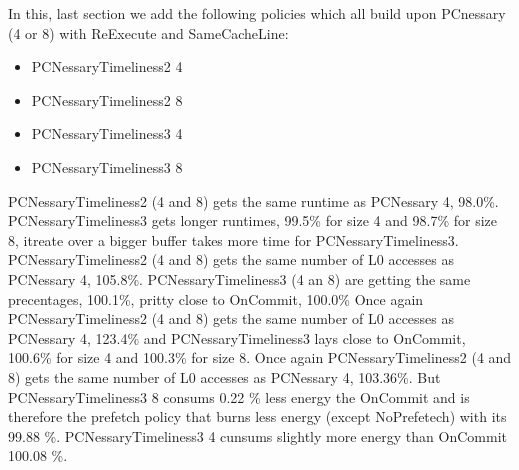 In this, last section we add the following policies which all build upon PCnessary (4 or 8) with ReExecute and SameCacheLine:
\begin{itemize}
	\item PCNessaryTimeliness2 4
	\item PCNessaryTimeliness2 8
	\item PCNessaryTimeliness3 4
	\item PCNessaryTimeliness3 8
\end{itemize}
\resExtime
{}
PCNessaryTimeliness2 (4 and 8) gets the same runtime as PCNessary 4, 98.0\%. PCNessaryTimeliness3 gets longer runtimes, 99.5\% for size 4 and 98.7\% for size 8, itreate over a bigger buffer takes more time for PCNessaryTimeliness3.
\resAcc
{}
PCNessaryTimeliness2 (4 and 8) gets the same number of L0 accesses as PCNessary 4, 105.8\%. PCNessaryTimeliness3 (4 an 8) are getting the same precentages, 100.1\%, pritty close to OnCommit, 100.0\%
\resSp
{}
Once again PCNessaryTimeliness2 (4 and 8) gets the same number of L0 accesses as PCNessary 4, 123.4\% and PCNessaryTimeliness3 lays close to OnCommit, 100.6\% for size 4 and 100.3\% for size 8.
\resEnergy
{}
Once again PCNessaryTimeliness2 (4 and 8) gets the same number of L0 accesses as PCNessary 4, 103.36\%. But PCNessaryTimeliness3 8 consums 0.22 \% less energy the OnCommit and is therefore the prefetch policy that burns less energy (except NoPrefetech) with its 99.88 \%.     PCNessaryTimeliness3 4 cunsums slightly more energy than OnCommit  100.08 \%.
  
